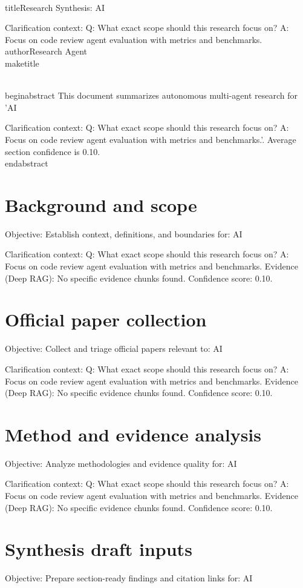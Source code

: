 \documentclass[conference]{IEEEtran}
\begin{document}
\\titleResearch Synthesis: AI

Clarification context:
Q: What exact scope should this research focus on?
A: Focus on code review agent evaluation with metrics and benchmarks.
\\authorResearch Agent
\\maketitle

\\begin{abstract}
This document summarizes autonomous multi-agent research for 'AI

Clarification context:
Q: What exact scope should this research focus on?
A: Focus on code review agent evaluation with metrics and benchmarks.'. Average section confidence is 0.10.
\\end{abstract}

\section{Background and scope}
Objective: Establish context, definitions, and boundaries for: AI

Clarification context:
Q: What exact scope should this research focus on?
A: Focus on code review agent evaluation with metrics and benchmarks.
Evidence (Deep RAG):
No specific evidence chunks found.
Confidence score: 0.10.

\section{Official paper collection}
Objective: Collect and triage official papers relevant to: AI

Clarification context:
Q: What exact scope should this research focus on?
A: Focus on code review agent evaluation with metrics and benchmarks.
Evidence (Deep RAG):
No specific evidence chunks found.
Confidence score: 0.10.

\section{Method and evidence analysis}
Objective: Analyze methodologies and evidence quality for: AI

Clarification context:
Q: What exact scope should this research focus on?
A: Focus on code review agent evaluation with metrics and benchmarks.
Evidence (Deep RAG):
No specific evidence chunks found.
Confidence score: 0.10.

\section{Synthesis draft inputs}
Objective: Prepare section-ready findings and citation links for: AI
\end{document}
